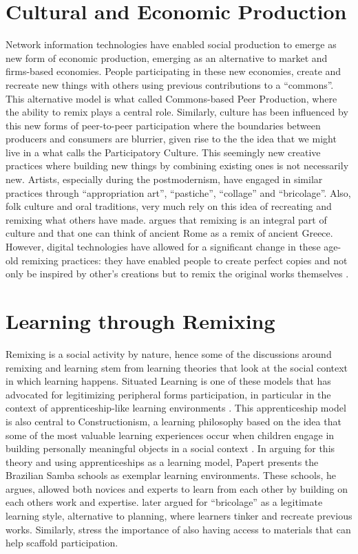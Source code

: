 \section{Cultural and Economic Production}
Network information technologies have enabled social production to emerge as new form of economic production, emerging as an alternative to market and firms-based economies.
People participating in these new economies, create and recreate new things with others using previous contributions to a ``commons''. 
This alternative model is what \citet{benkler_coases_2002} called Commons-based Peer Production, where the ability to remix plays a central role.
Similarly, culture has been influenced by this new forms of peer-to-peer participation where the boundaries between producers and consumers are blurrier, given rise to the the idea that we might live in a what \citet{jenkins_convergence_2009} calls the Participatory Culture.
This seemingly new creative practices where building new things by combining existing ones is not necessarily new. 
Artists, especially during the postmodernism, have engaged in similar practices through ``appropriation art'', ``pastiche'', ``collage'' and ``bricolage''. 
Also, folk culture and oral traditions, very much rely on this idea of recreating and remixing what others have made. %
\citet{manovich_remix_2005} argues that remixing is an integral part of culture and that one can think of ancient Rome as a remix of ancient Greece.
However, digital technologies have allowed for a  significant change in these age-old remixing practices: they have enabled  people to create perfect copies and not only be inspired by other's creations but to remix the original works themselves \citep{sinnreich_ethics_2009}.

\section{Learning through Remixing}
Remixing is a social activity by nature, hence some of the discussions around remixing and learning stem from learning theories that look at the social context in which learning happens. 
Situated Learning is one of these models that has advocated for legitimizing peripheral forms participation, in particular in the context of apprenticeship-like learning environments \citep{lave_situated_1991}. 
This apprenticeship model is also central to Constructionism, a learning philosophy based on the idea that some of the most valuable learning experiences occur when children engage in building personally meaningful objects in a social context \citet{papert}. 
In arguing for this theory and using apprenticeships as a learning model, Papert presents the Brazilian Samba schools as exemplar learning environments. These schools, he argues, allowed both novices and experts to learn from each other by building on each others work and expertise. 
\citet{papert_turkle} later argued for ``bricolage'' as a legitimate learning style, alternative to planning, where learners tinker and recreate previous works.
Similarly,  \citet{wenger} stress the importance of also having access to materials that can help scaffold participation.

